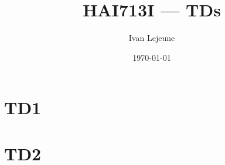 \documentclass[french,a4paper,10pt]{article}
\title{\color{astral} \sffamily \bfseries HAI713I --- TDs}
\author{Ivan Lejeune}
\date{\today}
\begin{document}
    \maketitle
    \tableofcontents

    \newpage
    \section{TD1}\label{sec:TD1}
    \setcounter{tdcounter}{0}
    

    \newpage
    \section{TD2}\label{sec:TD2}
    \setcounter{tdcounter}{0}
    
\end{document}
